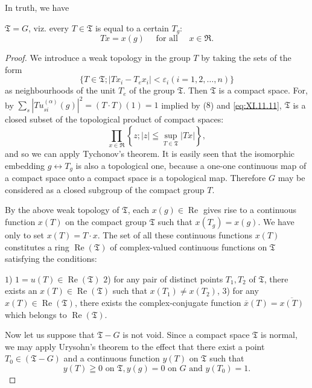 In truth, we have 

\begin{theorem}\label{thm:XI.11.Theorem.2} $\mathfrak{T} = G$, viz. every $T \in \mathfrak{T}$ is equal to a certain $T_g$: 
\begin{equation}\label{eq:XI.11.12}
T x = x (g) \quad \text{ for all } \quad x \in \mathfrak {R}.
\end{equation}
\end{theorem}

\begin{proof}
 We introduce a weak topology in the group $T$ by taking the sets of the form 
\begin{equation}\label{eq:XI.11.13}
\{T \in \mathfrak {T}; | T x _{i} - T _{e} x _{i} | < \varepsilon_{i} (i = 1, 2, \dots , n) \}
\end{equation}
as neighbourhoods of the unit $T_{e}$ of the group $\mathfrak{T}$. Then $\mathfrak{T}$ is a compact space. For, by $\sum\limits_{s}|T u_{si}^{(\alpha)}(g)|^2 = (T \cdot T)(1) = 1$ implied by ($8$) and \eqref{eq:XI.11.11}, 
$\mathfrak{T}$ is a closed subset of the topological product of compact spaces: 
\[
\prod\limits_ {x \in \mathfrak {R}} \left\{z; | z | \leqq \sup\limits _ {T \in \mathfrak {T}} | T x | \right\},
\]
and so we can apply Tychonov's theorem. It is easily seen that the isomorphic embedding $g \leftrightarrow T_{g}$ is also a topological one, because a one-one continuous map of a compact space onto a compact space is a topological map. Therefore $G$ may be considered as a closed subgroup of the compact group $T$. 

By the above weak topology of $\mathfrak{T}$, each $x(g) \in \operatorname{Re}$ gives rise to a continuous function $x(T)$ on the compact group $\mathfrak{T}$ such that $x(T_g) = x(g)$. We have only to set $x(T) = T \cdot x$. The set of all these continuous functions $x(T)$ constitutes a ring $\operatorname{Re}(\mathfrak{T})$ of complex-valued continuous functions on $\mathfrak{T}$ satisfying the conditions: 

$1$) $1 = u(T)\in \operatorname{Re} (\mathfrak{T})$ 
$2$) for any pair of distinct points $T_{1}, T_{2}$ of $\mathfrak{T}$, there exists an $x(T) \in \operatorname{Re}(\mathfrak{T})$ such that $x(T_{1}) \neq x(T_{2})$, 
$3$) for any $x(T) \in \operatorname{Re}(\mathfrak{T})$, there exists the complex-conjugate function $\overline{x}(T) = \overline{x(T)}$ which belongs to $\operatorname{Re}(\mathfrak{T})$. 

Now let us suppose that $\mathfrak{T} - G$ is not void. Since a compact space $\mathfrak{T}$ is normal, we may apply Urysohn's theorem to the effect that there exist a point $T_0 \in (\mathfrak{T} - G)$ and a continuous function $y(T)$ on $\mathfrak{T}$ such that 
\begin{equation}\label{eq:XI.11.14}
y (T) \geqq 0 \text{ on } \mathfrak {T}, y (g) = 0 \text{ on } G \text{ and } y (T _{0}) = 1.
\end{equation}


\end{proof}
